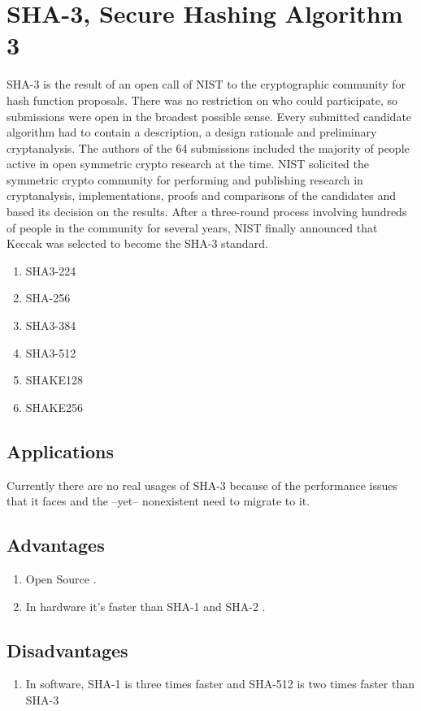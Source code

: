 \documentclass[]{article}
\begin{document}
\section{SHA-3, Secure Hashing Algorithm 3}
SHA-3 is the result of an open call of NIST to the cryptographic community for hash function proposals. There was no restriction on who could participate, so submissions were open in the broadest possible sense. Every submitted candidate algorithm had to contain a description, a design rationale and preliminary cryptanalysis. The authors of the 64 submissions included the majority of people active in open symmetric crypto research at the time. NIST solicited the symmetric crypto community for performing and publishing research in cryptanalysis, implementations, proofs and comparisons of the candidates and based its decision on the results. After a three-round process involving hundreds of people in the community for several years, NIST finally announced that Keccak was selected to become the SHA-3 standard\cite{biKeccakTeambid}.
\begin{enumerate}
	\item SHA3-224
	\item SHA-256
	\item SHA3-384
	\item SHA3-512
	\item SHAKE128
	\item SHAKE256
\end{enumerate}

\subsection{Applications}
Currently there are no real usages of SHA-3 because of the performance issues that it faces and the --yet-- nonexistent need to migrate to it.

\subsection{Advantages}
\begin{enumerate}
	\item Open Source \cite{KeccakTeam}.
	\item In hardware it's faster than SHA-1 and SHA-2 \cite{grimesWhyArenWe2018}.
\end{enumerate}

\subsection{Disadvantages}
\begin{enumerate}
	\item In software, SHA-1 is three times faster and SHA-512 is two times faster than SHA-3 \cite{grimesWhyArenWe2018}
\end{enumerate}
\end{document}
